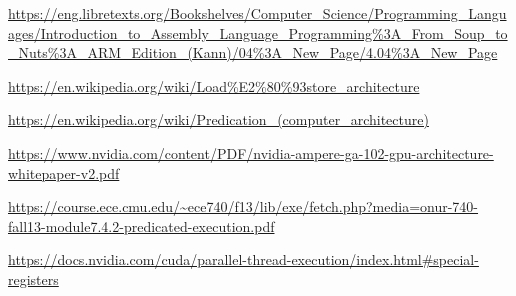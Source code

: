 \url{https://eng.libretexts.org/Bookshelves/Computer_Science/Programming_Languages/Introduction_to_Assembly_Language_Programming%3A_From_Soup_to_Nuts%3A_ARM_Edition_(Kann)/04%3A_New_Page/4.04%3A_New_Page}

\url{https://en.wikipedia.org/wiki/Load%E2%80%93store_architecture}

\url{https://en.wikipedia.org/wiki/Predication_(computer_architecture)}

\url{https://www.nvidia.com/content/PDF/nvidia-ampere-ga-102-gpu-architecture-whitepaper-v2.pdf}

\url{https://course.ece.cmu.edu/~ece740/f13/lib/exe/fetch.php?media=onur-740-fall13-module7.4.2-predicated-execution.pdf}

\url{https://docs.nvidia.com/cuda/parallel-thread-execution/index.html#special-registers}
